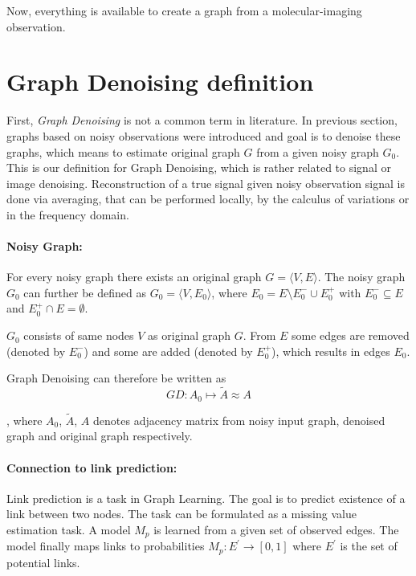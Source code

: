 Now, everything is available to create a graph from a molecular-imaging observation.


\section{Graph Denoising definition}

First, \textit{Graph Denoising} is not a common term in literature.
In previous section, graphs based on noisy observations were introduced and goal is to denoise these graphs,
which means to estimate original graph $G$ from a given noisy graph $G_0$. 
This is our definition for Graph Denoising, which is rather related to signal or image denoising.
Reconstruction of a true signal given noisy observation signal is done via averaging, that can be performed
locally, by the calculus of variations or in the frequency domain\cite{noneLocalMean}. 

\paragraph{Noisy Graph:}
For every noisy graph there exists an original graph $G = \langle V,E \rangle$.
The noisy graph $G_0$ can further be defined as $G_0 = \langle V, E_0 \rangle$,  
 where $E_0 = E \setminus  E^{-}_0 \cup  E^{+}_0$ with $E^{-}_0 \subseteq E$ and $E^{+}_0 \cap E = \emptyset$.

$G_0$ consists of same nodes $V$ as original graph $G$. 
From $E$ some edges are removed (denoted by $E^{-}_0$) and some are added
(denoted by $E^{+}_0$), which results in edges $E_0$.

Graph Denoising can therefore be written as 
\begin{equation}
    GD: A_0 \mapsto \tilde{A} \approx A
\end{equation}

, where $A_0$, $\tilde{A}$, $A$ denotes adjacency matrix from noisy input graph, denoised graph and original graph respectively.


\paragraph{Connection to link prediction:}
Link prediction is a task in Graph Learning. 
The goal is to predict existence of a link between two nodes.
The task can be formulated as a missing value estimation task. A model $M_p$ is learned
from a given set of observed edges. The model finally maps links to probabilities
$M_p : E^{\prime} \rightarrow [0,1]$ where $E^{\prime}$ is the set of potential links.


